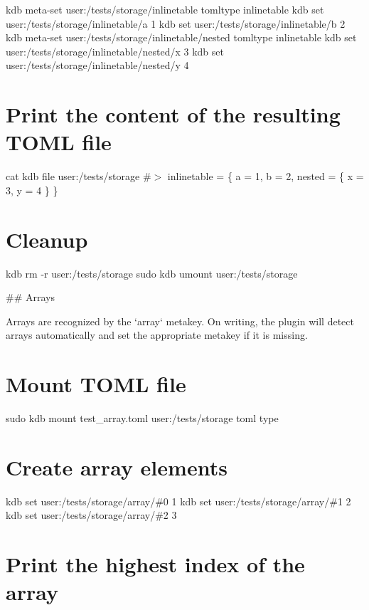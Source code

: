 kdb meta-\/set \textquotesingle{}user\+:/tests/storage/inlinetable\textquotesingle{} \textquotesingle{}tomltype\textquotesingle{} \textquotesingle{}inlinetable\textquotesingle{} kdb set \textquotesingle{}user\+:/tests/storage/inlinetable/a\textquotesingle{} \textquotesingle{}1\textquotesingle{} kdb set \textquotesingle{}user\+:/tests/storage/inlinetable/b\textquotesingle{} \textquotesingle{}2\textquotesingle{} kdb meta-\/set \textquotesingle{}user\+:/tests/storage/inlinetable/nested\textquotesingle{} \textquotesingle{}tomltype\textquotesingle{} \textquotesingle{}inlinetable\textquotesingle{} kdb set \textquotesingle{}user\+:/tests/storage/inlinetable/nested/x\textquotesingle{} \textquotesingle{}3\textquotesingle{} kdb set \textquotesingle{}user\+:/tests/storage/inlinetable/nested/y\textquotesingle{} \textquotesingle{}4\textquotesingle{}\hypertarget{autotoc_md642_autotoc_md720}{}\section{Print the content of the resulting T\+O\+M\+L file}\label{autotoc_md642_autotoc_md720}
cat {\ttfamily kdb file user\+:/tests/storage} \#$>$ inlinetable = \{ a = 1, b = 2, nested = \{ x = 3, y = 4 \} \}\hypertarget{autotoc_md642_autotoc_md721}{}\section{Cleanup}\label{autotoc_md642_autotoc_md721}
kdb rm -\/r user\+:/tests/storage sudo kdb umount user\+:/tests/storage 
\begin{DoxyCode}
## Arrays

Arrays are recognized by the `array` metakey. On writing, the plugin will detect arrays automatically and
       set the appropriate metakey if it is missing.
\end{DoxyCode}
 \hypertarget{autotoc_md642_autotoc_md722}{}\section{Mount T\+O\+M\+L file}\label{autotoc_md642_autotoc_md722}
sudo kdb mount test\+\_\+array.\+toml user\+:/tests/storage toml type\hypertarget{autotoc_md642_autotoc_md723}{}\section{Create array elements}\label{autotoc_md642_autotoc_md723}
kdb set \textquotesingle{}user\+:/tests/storage/array/\#0\textquotesingle{} \textquotesingle{}1\textquotesingle{} kdb set \textquotesingle{}user\+:/tests/storage/array/\#1\textquotesingle{} \textquotesingle{}2\textquotesingle{} kdb set \textquotesingle{}user\+:/tests/storage/array/\#2\textquotesingle{} \textquotesingle{}3\textquotesingle{}\hypertarget{autotoc_md642_autotoc_md724}{}\section{Print the highest index of the array}\label{autotoc_md642_autotoc_md724}
